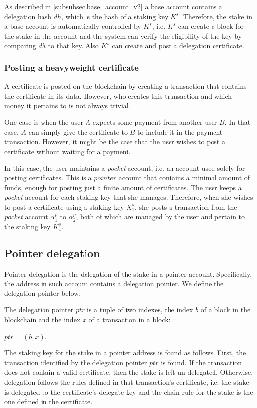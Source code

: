 As described in \ref{subsubsec:base_account_v2} a base account contains a delegation hash $dh$, which is the hash of a staking key $K^s$. Therefore, the stake in a base account is automatically controlled by $K^s$, i.e. $K^s$ can create a block for the stake in the account and the system can verify the eligibility of the key by comparing $dh$ to that key. Also $K^s$ can create and post a delegation certificate.

\subsubsection{Posting a heavyweight certificate}

A certificate is posted on the blockchain by creating a transaction that contains the certificate in its data. However, who creates this transaction and which money it pertains to is not always trivial.

One case is when the user $A$ expects some payment from another user $B$. In that case, $A$ can simply give the certificate to $B$ to include it in the payment transaction. However, it might be the case that the user wishes to post a certificate without waiting for a payment.

In this case, the user maintains a \textit{pocket} account, i.e. an account used solely for posting certificates. This is a $pointer$ account that contains a minimal amount of funds, enough for posting just a finite amount of certificates. The user keeps a \textit{pocket} account for each staking key that she manages. Therefore, when she wishes to post a certificate using a staking key $K^s_1$, she posts a transaction from the \textit{pocket} account ${\alpha}^p_1$ to ${\alpha}^p_2$, both of which are managed by the user and pertain to the staking key $K^s_1$.

\subsection{Pointer delegation}

Pointer delegation is the delegation of the stake in a pointer account. Specifically, the address in such account contains a delegation pointer. We define the delegation pointer below.

\begin{defn}\label{def:delegation_pointer}
The delegation pointer $ptr$ is a tuple of two indexes, the index $b$ of a block in the blockchain and the index $x$ of a transaction in a block:

$ptr = (b, x)$.
\end{defn}

The staking key for the stake in a pointer address is found as follows. First, the transaction identified by the delegation pointer $ptr$ is found. If the transaction does not contain a valid certificate, then the stake is left un-delegated. Otherwise, delegation follows the rules defined in that transaction's certificate, i.e. the stake is delegated to the certificate's delegate key and the chain rule for the stake is the one defined in the certificate.
